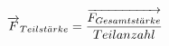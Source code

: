 \documentclass[preview]{standalone}
\begin{document}
\begin{align*}
\special{dvisvgm:raw <g id='unique000'>}\overrightarrow{F}_{Teilst \ddot{a} rke} = \frac{\overrightarrow{F_{Gesamtst \ddot{a} rke}}} {Teilanzahl}\special{dvisvgm:raw </g>}
\end{align*}
\end{document}
